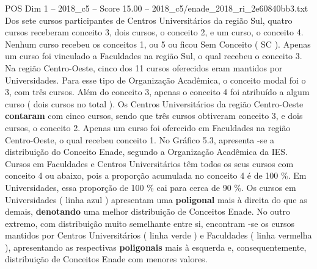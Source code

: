 \begin{textsample}{POS Dim 1 – 2018\_c5 – Score 15.00 – 2018\_c5/enade\_2018\_ri\_2e60840bb3.txt}
Dos sete cursos participantes de Centros Universitários da região Sul, quatro cursos receberam conceito 3, dois cursos, o conceito 2, e um curso, o conceito 4.
Nenhum curso recebeu os conceitos 1, ou 5 ou ficou Sem Conceito ( SC ).
Apenas um curso foi vinculado a Faculdades na região Sul, o qual recebeu o conceito 3.
Na região Centro-Oeste, cinco dos 11 cursos oferecidos eram mantidos por Universidades.
Para esse tipo de Organização Acadêmica, o conceito modal foi o 3, com três cursos.
Além do conceito 3, apenas o conceito 4 foi atribuído a algum curso ( dois cursos no total ).
Os Centros Universitários da região Centro-Oeste \textbf{contaram} com cinco cursos, sendo que três cursos obtiveram conceito 3, e dois cursos, o conceito 2.
Apenas um curso foi oferecido em Faculdades na região Centro-Oeste, o qual recebeu conceito 1.
No Gráfico 5.3, apresenta -se a distribuição do Conceito Enade, segundo a Organização Acadêmica da IES.
Cursos em Faculdades e Centros Universitários têm todos os seus cursos com conceito 4 ou abaixo, pois a proporção acumulada no conceito 4 é de 100 \%.
Em Universidades, essa proporção de 100 \% cai para cerca de 90 \%.
Os cursos em Universidades ( linha azul ) apresentam uma \textbf{poligonal} mais à direita do que as demais, \textbf{denotando} uma melhor distribuição de Conceitos Enade.
No outro extremo, com distribuição muito semelhante entre si, encontram -se os cursos mantidos por Centros Universitários ( linha verde ) e Faculdades ( linha vermelha ), apresentando as respectivas \textbf{poligonais} mais à esquerda e, consequentemente, distribuição de Conceitos Enade com menores valores.

\end{textsample}
